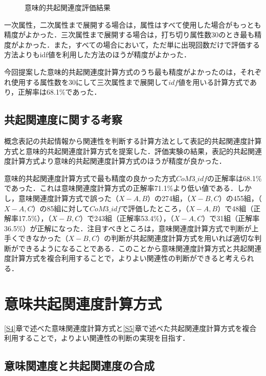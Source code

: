 \begin{figure}[tb]
\begin{center}
\end{center}
\caption{意味的共起関連度評価結果}
\label{Fig5}
\end{figure}

一次属性，二次属性まで展開する場合は，属性はすべて使用した場合がもっとも精度がよかった．三次属性まで展開する場合は，打ち切り属性数30のとき最も精度がよかった．また，すべての場合において，ただ単に出現回数だけで評価する方法よりもidf値を利用した方法のほうが精度がよかった．

今回提案した意味的共起関連度計算方式のうち最も精度がよかったのは，それぞれ使用する属性数を30にして三次属性まで展開して$idf$値を用いる計算方式であり，正解率は68.1\%であった．

\subsection{共起関連度に関する考察}

概念表記の共起情報から関連性を判断する計算方法として表記的共起関連度計算方式と意味的共起関連度計算方式を提案した．評価実験の結果，表記的共起関連度計算方式より意味的共起関連度計算方式のほうが精度が良かった．

意味的共起関連度計算方式で最も精度の良かった方式$CoM3\_idf$の正解率は68.1\%であった．これは意味関連度計算方式の正解率71.1\%より低い値である．しかし，意味関連度計算方式で誤った（$X-A,B$）の274組，（$X-B,C$）の455組，（$X-A,C$）の85組に対して$CoM3\_idf$で評価したところ，（$X-A,B$）で48組（正解率17.5\%），（$X-B,C$）で243組（正解率53.4\%），（$X-A,C$）で31組（正解率36.5\%）が正解になった．注目すべきところは，意味関連度計算方式で判断が上手くできなかった（$X-B,C$）の判断が共起関連度計算方式を用いれば適切な判断ができるようになることである．このことから意味関連度計算方式と共起関連度計算方式を複合利用することで，よりよい関連性の判断ができると考えられる．


\section{意味共起関連度計算方式}

\ref{S4}章で述べた意味関連度計算方式と\ref{S5}章で述べた共起関連度計算方式を複合利用することで，よりよい関連性の判断の実現を目指す．

\subsection{意味関連度と共起関連度の合成}

